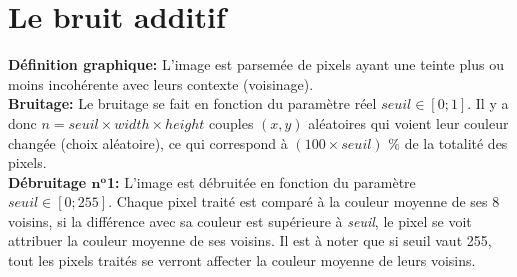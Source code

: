 \documentclass{article}
\begin{document}
	\newpage
	
	
		\section{Le bruit additif}
		\textbf{Définition graphique: }L'image est parsemée de pixels ayant une teinte plus ou moins incohérente avec leurs contexte (voisinage).\\
		\textbf{Bruitage: }Le bruitage se fait en fonction du paramètre réel \begin{math}seuil\in[0;1]\end{math}. Il y a donc \begin{math}n = seuil\times width\times height\end{math} couples \begin{math}(x, y)\end{math} aléatoires qui voient leur couleur changée (choix aléatoire), ce qui correspond à \begin{math}(100\times seuil)\end{math} \% de la totalité des pixels.\\
		\textbf{Débruitage \begin{math}\textbf{n}^\textbf{o}\end{math}1: }L'image est débruitée en fonction du paramètre \begin{math}seuil \in [0;255]\end{math}. Chaque pixel traité est comparé à la couleur moyenne de ses 8 voisins, si la différence avec sa couleur est supérieure à \emph{seuil}, le pixel se voit attribuer la couleur moyenne de ses voisins. Il est à noter que si seuil vaut 255, tout les pixels traités se verront affecter la couleur moyenne de leurs voisins.\\\\
\end{document}
